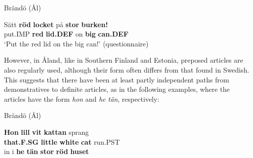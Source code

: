 
\item 

Brändö (Ål)



 \ea\label{}
\gll Sätt  \textbf{röd} \textbf{locket} på  \textbf{stor} \textbf{burken!}\\


put.IMP  \textbf{red} \textbf{lid.DEF} on  \textbf{big} \textbf{can.DEF}\\

\glt ‘Put the red lid on the big can!’ (questionnaire)

\z

However, in Åland, like in Southern Finland and Estonia, preposed articles are also regularly used, although their form often differs from that found in Swedish. This suggests that there have been at least partly independent paths from demonstratives to definite articles, as in the following examples, where the articles have the form \textit{hon} and \textit{he tän}, respectively:


\item 

Brändö (Ål)



 \ea\label{}
\gll \textbf{Hon} \textbf{lill} \textbf{vit} \textbf{kattan} sprang\\


\textbf{that.F.SG} \textbf{little} \textbf{white} \textbf{cat} run.PST\\

 \ea\label{}
\gll in  i  \textbf{he} \textbf{tän} \textbf{stor} \textbf{röd} \textbf{huset} \\


